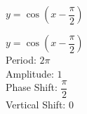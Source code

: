 {$y = \cos \left( x - \dfrac{\pi}{2} \right)$}
{$y = \cos \left( x - \dfrac{\pi}{2} \right)$\\
Period: $2\pi$\\
Amplitude: $1$\\
Phase Shift: $\dfrac{\pi}{2}$\\
Vertical Shift: $0$

\begin{center}
\end{center}
}
